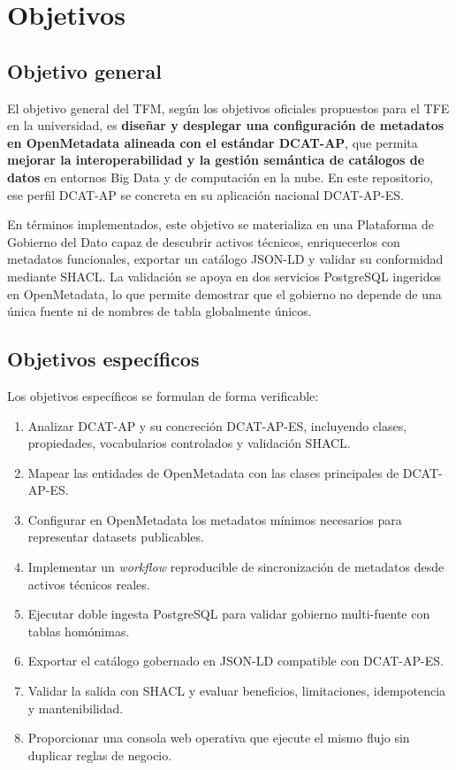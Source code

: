 \chapter{Objetivos}\label{cap:objetivos}

\section{Objetivo general}

El objetivo general del TFM, según los objetivos oficiales propuestos para el TFE en la universidad, es \textbf{diseñar y desplegar una configuración de metadatos en OpenMetadata alineada con el estándar DCAT-AP}, que permita \textbf{mejorar la interoperabilidad y la gestión semántica de catálogos de datos} en entornos Big Data y de computación en la nube. En este repositorio, ese perfil DCAT-AP se concreta en su aplicación nacional DCAT-AP-ES.

En términos implementados, este objetivo se materializa en una Plataforma de Gobierno del Dato capaz de descubrir activos técnicos, enriquecerlos con metadatos funcionales, exportar un catálogo JSON-LD y validar su conformidad mediante SHACL. La validación se apoya en dos servicios PostgreSQL ingeridos en OpenMetadata, lo que permite demostrar que el gobierno no depende de una única fuente ni de nombres de tabla globalmente únicos.

\section{Objetivos específicos}

Los objetivos específicos se formulan de forma verificable:

\begin{enumerate}
  \item Analizar DCAT-AP y su concreción DCAT-AP-ES, incluyendo clases, propiedades, vocabularios controlados y validación SHACL.
  \item Mapear las entidades de OpenMetadata con las clases principales de DCAT-AP-ES.
  \item Configurar en OpenMetadata los metadatos mínimos necesarios para representar datasets publicables.
  \item Implementar un \emph{workflow} reproducible de sincronización de metadatos desde activos técnicos reales.
  \item Ejecutar doble ingesta PostgreSQL para validar gobierno multi-fuente con tablas homónimas.
  \item Exportar el catálogo gobernado en JSON-LD compatible con DCAT-AP-ES.
  \item Validar la salida con SHACL y evaluar beneficios, limitaciones, idempotencia y mantenibilidad.
  \item Proporcionar una consola web operativa que ejecute el mismo flujo sin duplicar reglas de negocio.
\end{enumerate}

